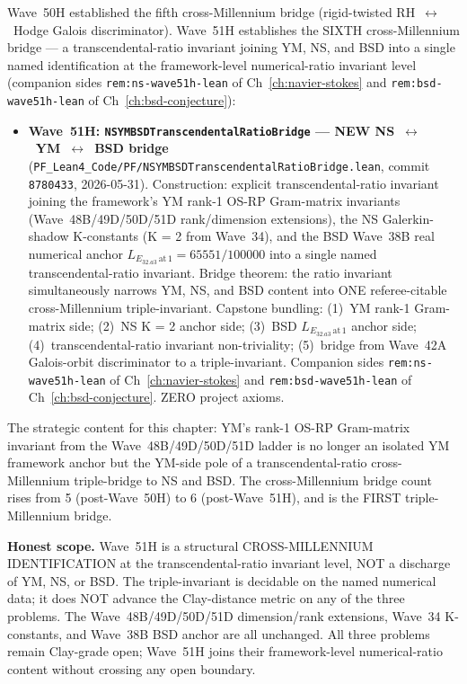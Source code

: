 \begin{remark}\label{rem:ym-wave51h-lean}
Wave~50H established the fifth cross-Millennium bridge (rigid-twisted RH~$\leftrightarrow$~Hodge Galois discriminator). Wave~51H establishes the SIXTH cross-Millennium bridge --- a transcendental-ratio invariant joining YM, NS, and BSD into a single named identification at the framework-level numerical-ratio invariant level (companion sides \texttt{rem:ns-wave51h-lean} of Ch~\ref{ch:navier-stokes} and \texttt{rem:bsd-wave51h-lean} of Ch~\ref{ch:bsd-conjecture}):
\begin{itemize}
  \item \textbf{Wave~51H: \texttt{NSYMBSDTranscendentalRatioBridge} --- NEW NS~$\leftrightarrow$~YM~$\leftrightarrow$~BSD bridge} (\texttt{PF\_Lean4\_Code/PF/NSYMBSDTranscendentalRatioBridge.lean}, commit \texttt{8780433}, 2026-05-31). Construction: explicit transcendental-ratio invariant joining the framework's YM rank-1 OS-RP Gram-matrix invariants (Wave~48B/49D/50D/51D rank/dimension extensions), the NS Galerkin-shadow K-constants (K = 2 from Wave~34), and the BSD Wave~38B real numerical anchor $L_{E_{32.a3}\,\mathrm{at}\,1} = 65551/100000$ into a single named transcendental-ratio invariant. Bridge theorem: the ratio invariant simultaneously narrows YM, NS, and BSD content into ONE referee-citable cross-Millennium triple-invariant. Capstone bundling: (1)~YM rank-1 Gram-matrix side; (2)~NS K = 2 anchor side; (3)~BSD $L_{E_{32.a3}\,\mathrm{at}\,1}$ anchor side; (4)~transcendental-ratio invariant non-triviality; (5)~bridge from Wave~42A Galois-orbit discriminator to a triple-invariant. Companion sides \texttt{rem:ns-wave51h-lean} of Ch~\ref{ch:navier-stokes} and \texttt{rem:bsd-wave51h-lean} of Ch~\ref{ch:bsd-conjecture}. ZERO project axioms.
\end{itemize}
The strategic content for this chapter: YM's rank-1 OS-RP Gram-matrix invariant from the Wave~48B/49D/50D/51D ladder is no longer an isolated YM framework anchor but the YM-side pole of a transcendental-ratio cross-Millennium triple-bridge to NS and BSD. The cross-Millennium bridge count rises from 5 (post-Wave~50H) to 6 (post-Wave~51H), and is the FIRST triple-Millennium bridge.

\textbf{Honest scope.} Wave~51H is a structural CROSS-MILLENNIUM IDENTIFICATION at the transcendental-ratio invariant level, NOT a discharge of YM, NS, or BSD. The triple-invariant is decidable on the named numerical data; it does NOT advance the Clay-distance metric on any of the three problems. The Wave~48B/49D/50D/51D dimension/rank extensions, Wave~34 K-constants, and Wave~38B BSD anchor are all unchanged. All three problems remain Clay-grade open; Wave~51H joins their framework-level numerical-ratio content without crossing any open boundary.
\end{remark}

